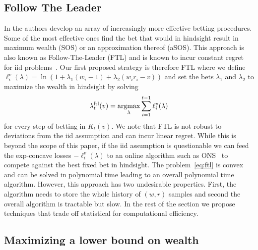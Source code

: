 \subsection{Follow The Leader}
In \cite{waudby-smith_variance-adaptive_2020} the authors develop an array of
increasingly more effective betting procedures.  Some of the most effective
ones find the bet that would in hindsight result in maximum wealth (SOS) or an
approximation thereof (aSOS).  This approach is also known as Follow-The-Leader
(FTL) and is known to incur constant regret for iid
problems~\cite{de2014follow}.  Our first proposed strategy is therefore FTL
where we define $\ell_i^v(\lambda)=\ln(1+\lambda_1 (w_i-1)+\lambda_2(w_i r_i -
v))$ and set the bets $\lambda_1$ and $\lambda_2$ to maximize the wealth in
hindsight by solving
\begin{equation}
\lambda_{t}^{\textrm{ftl}}(v) = \operatorname*{argmax}_{\lambda} \sum_{i=1}^{t-1}
\ell_{i}^{v}(\lambda)
\label{eq:ftl}
\end{equation}
for every step of betting in $K_t(v)$.  We note that FTL is not robust to
deviations from the iid assumption and can incur linear regret. While this is
beyond the scope of this paper, if the iid assumption is questionable we can
feed the exp-concave losses $-\ell_i^v(\lambda)$ to an online algorithm such as
ONS~\cite{hazan2007logarithmic} to compete against the best fixed bet in
hindsight.  The problem~\eqref{eq:ftl} is convex and can be solved in
polynomial time leading to an overall polynomial time algorithm. However, this
approach has two undesirable properties. First, the algorithm needs to store
the whole history of $(w,r)$ samples and second the overall algorithm is
tractable but slow.  In the rest of the section we propose techniques that
trade off statistical for computational efficiency.

\subsection{Maximizing a lower bound on wealth}

